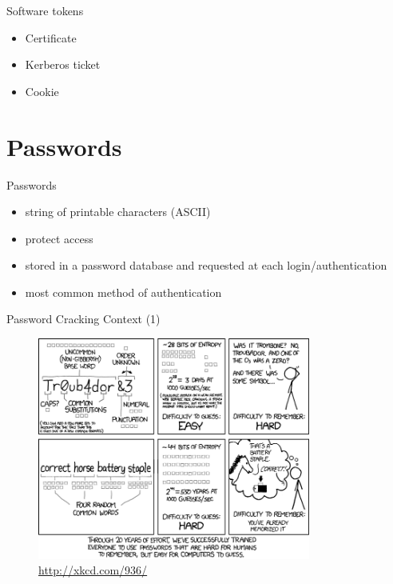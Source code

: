 \documentclass{curs}
\begin{document}
\begin{frame}{Software tokens}
  \begin{itemize}
    \item Certificate
    \item Kerberos ticket
    \item Cookie
  \end{itemize}
\end{frame}

\section {Passwords}

\begin{frame}{Passwords}
  \begin{itemize}
    \item string of printable characters (ASCII)
    \item protect access
    \item stored in a password database and requested at each
      login/authentication
    \item most common method of authentication
  \end{itemize}
\end{frame}

\begin{frame}{Password Cracking Context (1)}
  \begin{figure}
    \centering
    \includegraphics[width=0.8\textwidth]{img/password-strength.png} \\
    \tiny{\url{http://xkcd.com/936/}}
  \end{figure}
\end{frame}
\end{document}
